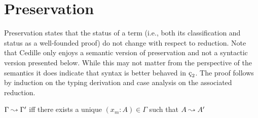 \section{Preservation}

Preservation states that the status of a term (i.e., both its classification and status as a well-founded proof) do not change with respect to reduction.
Note that Cedille only enjoys a semantic version of preservation and not a syntactic version presented below.
While this may not matter from the perspective of the semantics it does indicate that syntax is better behaved in $\ced$.
The proof follows by induction on the typing derivation and case analysis on the associated reduction.

\begin{definition}
    $\Gamma \leadsto \Gamma^\prime$ iff there exists a unique $(x_m : A) \in \Gamma$ such that $A \leadsto A^\prime$
\end{definition}

